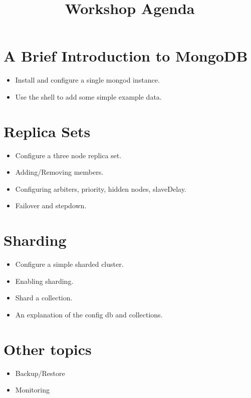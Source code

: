 \documentclass[letter]{article}
\title{\phantomsection%
  Workshop Agenda%
  \label{workshop-agenda}}
\author{}
\date{}
\begin{document}
\maketitle


\section{A Brief Introduction to MongoDB%
  \label{a-brief-introduction-to-mongodb}%
}
%
\begin{itemize}

\item Install and configure a single mongod instance.

\item Use the shell to add some simple example data.

\end{itemize}


\section{Replica Sets%
  \label{replica-sets}%
}
%
\begin{itemize}

\item Configure a three node replica set.

\item Adding/Removing members.

\item Configuring arbiters, priority, hidden nodes, slaveDelay.

\item Failover and stepdown.

\end{itemize}


\section{Sharding%
  \label{sharding}%
}
%
\begin{itemize}

\item Configure a simple sharded cluster.

\item Enabling sharding.

\item Shard a collection.

\item An explanation of the config db and collections.

\end{itemize}


\section{Other topics%
  \label{other-topics}%
}
%
\begin{itemize}

\item Backup/Restore

\item Monitoring

\end{itemize}
\end{document}
